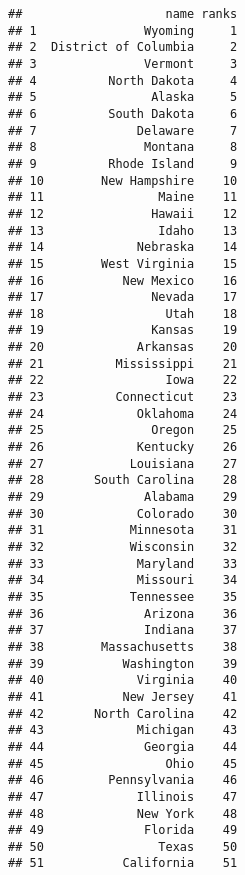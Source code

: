 \documentclass[
]{article}
\newenvironment{Shaded}{\begin{snugshade}}{\end{snugshade}}
\newcommand{\AttributeTok}[1]{\textcolor[rgb]{0.77,0.63,0.00}{#1}}
\newcommand{\FunctionTok}[1]{\textcolor[rgb]{0.00,0.00,0.00}{#1}}
\newcommand{\NormalTok}[1]{#1}
\newcommand{\OtherTok}[1]{\textcolor[rgb]{0.56,0.35,0.01}{#1}}
\newcommand{\SpecialCharTok}[1]{\textcolor[rgb]{0.00,0.00,0.00}{#1}}
\begin{document}
\begin{Shaded}
\end{Shaded}

\begin{verbatim}
##                    name ranks
## 1               Wyoming     1
## 2  District of Columbia     2
## 3               Vermont     3
## 4          North Dakota     4
## 5                Alaska     5
## 6          South Dakota     6
## 7              Delaware     7
## 8               Montana     8
## 9          Rhode Island     9
## 10        New Hampshire    10
## 11                Maine    11
## 12               Hawaii    12
## 13                Idaho    13
## 14             Nebraska    14
## 15        West Virginia    15
## 16           New Mexico    16
## 17               Nevada    17
## 18                 Utah    18
## 19               Kansas    19
## 20             Arkansas    20
## 21          Mississippi    21
## 22                 Iowa    22
## 23          Connecticut    23
## 24             Oklahoma    24
## 25               Oregon    25
## 26             Kentucky    26
## 27            Louisiana    27
## 28       South Carolina    28
## 29              Alabama    29
## 30             Colorado    30
## 31            Minnesota    31
## 32            Wisconsin    32
## 33             Maryland    33
## 34             Missouri    34
## 35            Tennessee    35
## 36              Arizona    36
## 37              Indiana    37
## 38        Massachusetts    38
## 39           Washington    39
## 40             Virginia    40
## 41           New Jersey    41
## 42       North Carolina    42
## 43             Michigan    43
## 44              Georgia    44
## 45                 Ohio    45
## 46         Pennsylvania    46
## 47             Illinois    47
## 48             New York    48
## 49              Florida    49
## 50                Texas    50
## 51           California    51
\end{verbatim}
\end{document}
